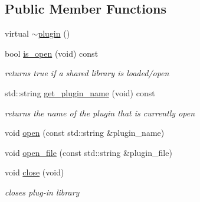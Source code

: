 \subsection*{Public Member Functions}
\begin{DoxyCompactItemize}
\item 
virtual \hyperlink{classpion_1_1plugin_a152b386f2f25db57ac7d87afb543ed91}{$\sim$plugin} ()
\item 
bool \hyperlink{classpion_1_1plugin_a61186fb4cf7ec683e7d9e9f54c507df8}{is\-\_\-open} (void) const 
\begin{DoxyCompactList}\small\item\em returns true if a shared library is loaded/open \end{DoxyCompactList}\item 
std\-::string \hyperlink{classpion_1_1plugin_afbb2e9290143f779b0d01d1ab925cde2}{get\-\_\-plugin\-\_\-name} (void) const 
\begin{DoxyCompactList}\small\item\em returns the name of the plugin that is currently open \end{DoxyCompactList}\item 
void \hyperlink{classpion_1_1plugin_ad2f241076913d3ef35caa298992aa21d}{open} (const std\-::string \&plugin\-\_\-name)
\item 
void \hyperlink{classpion_1_1plugin_aa3848e4da0ef4592079a378f1d81fe12}{open\-\_\-file} (const std\-::string \&plugin\-\_\-file)
\item 
void \hyperlink{classpion_1_1plugin_a4de512c3cdeb3cd9dedd3a49f754cc1a}{close} (void)
\begin{DoxyCompactList}\small\item\em closes plug-\/in library \end{DoxyCompactList}\end{DoxyCompactItemize}
